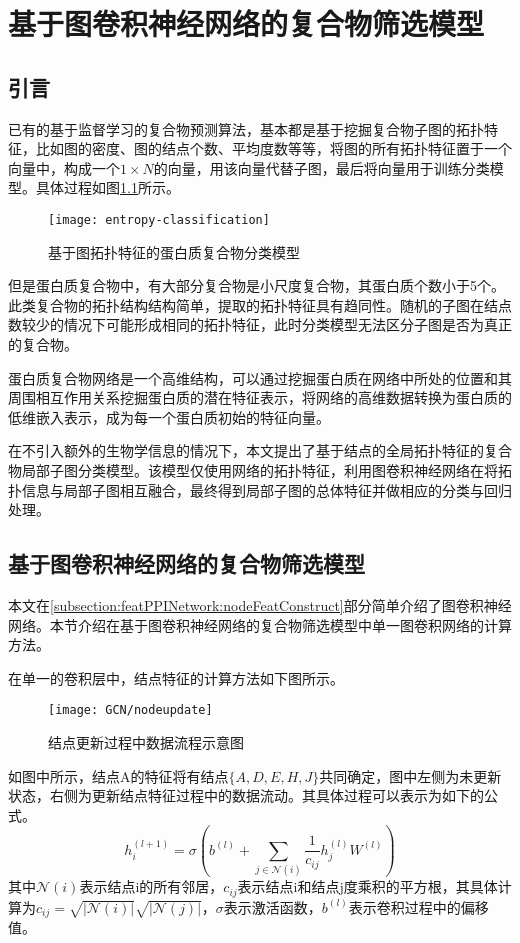 \chapter{基于图卷积神经网络的复合物筛选模型}
\label{chapter:NodeConv}

\section{引言}
\label{section:NodeConv:Put}

已有的基于监督学习的复合物预测算法，基本都是基于挖掘复合物子图的拓扑特征，比如图的密度、图的结点个数、平均度数等等，将图的所有拓扑特征置于一个向量中，构成一个$1\times N$的向量，用该向量代替子图，最后将向量用于训练分类模型。具体过程如图\ref{fig:entropy-classification}所示。

\begin{figure}[htbp]
    \centering
    \texttt{[image: entropy-classification]}
    \caption{基于图拓扑特征的蛋白质复合物分类模型}
    \label{fig:entropy-classification}
\end{figure}


但是蛋白质复合物中，有大部分复合物是小尺度复合物，其蛋白质个数小于5个。此类复合物的拓扑结构结构简单，提取的拓扑特征具有趋同性。随机的子图在结点数较少的情况下可能形成相同的拓扑特征，此时分类模型无法区分子图是否为真正的复合物。

蛋白质复合物网络是一个高维结构，可以通过挖掘蛋白质在网络中所处的位置和其周围相互作用关系挖掘蛋白质的潜在特征表示，将网络的高维数据转换为蛋白质的低维嵌入表示，成为每一个蛋白质初始的特征向量。

在不引入额外的生物学信息的情况下，本文提出了基于结点的全局拓扑特征的复合物局部子图分类模型。该模型仅使用网络的拓扑特征，利用图卷积神经网络在将拓扑信息与局部子图相互融合，最终得到局部子图的总体特征并做相应的分类与回归处理。

\section{基于图卷积神经网络的复合物筛选模型}
\label{section:NodeConv:detail}

本文在\ref{subsection:featPPINetwork:nodeFeatConstruct}部分简单介绍了图卷积神经网络。本节介绍在基于图卷积神经网络的复合物筛选模型中单一图卷积网络的计算方法。

在单一的卷积层中，结点特征的计算方法如下图所示。

\begin{figure}[htbp]
    \centering
    \texttt{[image: GCN/nodeupdate]}
    \caption{结点更新过程中数据流程示意图}
    \label{fig:GCN/nodeupdate}
\end{figure}
如图中所示，结点A的特征将有结点$\{A,D,E,H,J\}$共同确定，图中左侧为未更新状态，右侧为更新结点特征过程中的数据流动。其具体过程可以表示为如下的公式。
\begin{equation}
    \label{equ:loss}
    h_i^{(l+1)} = \sigma(b^{(l)} + \sum_{j\in\mathcal{N}(i)}\frac{1}{c_{ij}}h_j^{(l)}W^{(l)})
\end{equation}
其中$\mathcal{N}(i)$表示结点i的所有邻居，${c_{ij}}$表示结点i和结点j度乘积的平方根，其具体计算为$c_{ij} = \sqrt{|\mathcal{N}(i)|}\sqrt{|\mathcal{N}(j)|}$，$\sigma$表示激活函数，$b^{(l)}$表示卷积过程中的偏移值。

